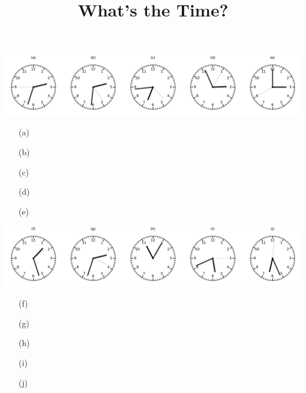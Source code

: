 \documentclass[a4paper, 11pt]{article}
\title{What's the Time?}
\date{}
\author{}
\begin{document}
\maketitle

\includegraphics[width=\textwidth]{clocks_5_0.pdf}
\begin{enumerate}\item[(a)] \dotfill\bigskip
\item[(b)] \dotfill\bigskip
\item[(c)] \dotfill\bigskip
\item[(d)] \dotfill\bigskip
\item[(e)] \dotfill\bigskip
\end{enumerate}\includegraphics[width=\textwidth]{clocks_5_1.pdf}
\begin{enumerate}\item[(f)] \dotfill\bigskip
\item[(g)] \dotfill\bigskip
\item[(h)] \dotfill\bigskip
\item[(i)] \dotfill\bigskip
\item[(j)] \dotfill\bigskip
\end{enumerate}
\end{document}
